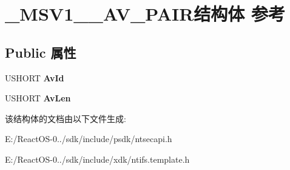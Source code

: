 \hypertarget{struct___m_s_v1__0___a_v___p_a_i_r}{}\section{\+\_\+\+M\+S\+V1\+\_\+\_\+\+A\+V\+\_\+\+P\+A\+I\+R结构体 参考}
\label{struct___m_s_v1__0___a_v___p_a_i_r}
\subsection*{Public 属性}
\begin{DoxyCompactItemize}
\item 
\mbox{\label{struct___m_s_v1__0___a_v___p_a_i_r_a4913e8e45ba262140f8e98a27e9cebd0}} 
U\+S\+H\+O\+RT {\bfseries Av\+Id}
\item 
\mbox{\label{struct___m_s_v1__0___a_v___p_a_i_r_a0492a9b6b94744159068bff4c9b337ad}} 
U\+S\+H\+O\+RT {\bfseries Av\+Len}
\end{DoxyCompactItemize}


该结构体的文档由以下文件生成\+:\begin{DoxyCompactItemize}
\item 
E\+:/\+React\+O\+S-\/0../sdk/include/psdk/ntsecapi.\+h\item 
E\+:/\+React\+O\+S-\/0../sdk/include/xdk/ntifs.\+template.\+h\end{DoxyCompactItemize}
